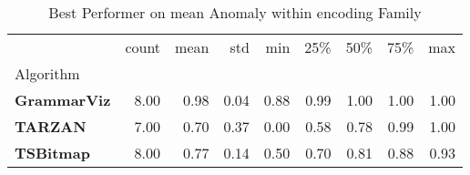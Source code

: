\begin{table}
\caption{Best Performer on mean Anomaly within encoding Family}
\label{tab:bp-mean_encoding}
\begin{tabular}{lrrrrrrrr}
\toprule
 & count & mean & std & min & 25\% & 50\% & 75\% & max \\
Algorithm &  &  &  &  &  &  &  &  \\
\midrule
\textbf{GrammarViz} & 8.00 & 0.98 & 0.04 & 0.88 & 0.99 & 1.00 & 1.00 & 1.00 \\
\textbf{TARZAN} & 7.00 & 0.70 & 0.37 & 0.00 & 0.58 & 0.78 & 0.99 & 1.00 \\
\textbf{TSBitmap} & 8.00 & 0.77 & 0.14 & 0.50 & 0.70 & 0.81 & 0.88 & 0.93 \\
\bottomrule
\end{tabular}
\end{table}
